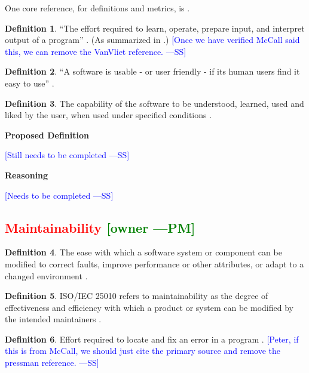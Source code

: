 \documentclass[letterpaper,cleveref]{lipics-v2019}
\newcommand{\authornote}[3]{\textcolor{#1}{[#3 ---#2]}}
\newcommand{\authornote}[3]{}
\newcommand{\wss}[1]{\authornote{blue}{SS}{#1}} %
\newcommand{\pmi}[1]{\authornote{green}{PM}{#1}} %
\newcommand{\notdone}[1]{\textcolor{red}{#1}}
\theoremstyle{definition}
\newtheorem{defn}{Definition}
\begin{document}
One core reference, for definitions and metrics, is
\citet{bevan1995measuring}.

\begin{defn}
  ``The effort required to learn, operate, prepare input, and interpret output
  of a program'' \citep{McCallEtAl1977}. (As summarized in
  \citet{VanVliet2000}.)  \wss{Once we have verified McCall said this, we can
    remove the VanVliet reference.}
\end{defn}

\begin{defn}
  ``A software is usable - or user friendly - if its human users find it easy
  to use'' \citep{ghezzi1991fundamentals}.
\end{defn}

\begin{defn}
  The capability of the software to be understood, learned, used and liked by
  the user, when used under specified conditions \cite{ISO9126}.
\end{defn}
\noindent \textbf{Proposed Definition}

\wss{Still needs to be completed}

\noindent \textbf{Reasoning}

\wss{Needs to be completed}

\subsection{\notdone{Maintainability} \pmi{owner}}

\begin{defn} \label{MaintainabilityDefnSelected1} 
  The ease with which a software system or component can be modified to correct
  faults, improve performance or other attributes, or adapt to a changed
  environment \citep{IEEEStdGlossarySET1990}.
\end{defn}

\begin{defn}
  ISO/IEC 25010 refers to maintainability as the degree of effectiveness and
  efficiency with which a product or system can be modified by the intended
  maintainers \citep{ISO/IEC25010}.
\end{defn}

\begin{defn}
  Effort required to locate and fix an error in a program
  \citep{pressman2005software}. \wss{Peter, if this is from
    McCall, we should just cite the primary source and remove the pressman
    reference.}
\end{defn}
\end{document}
